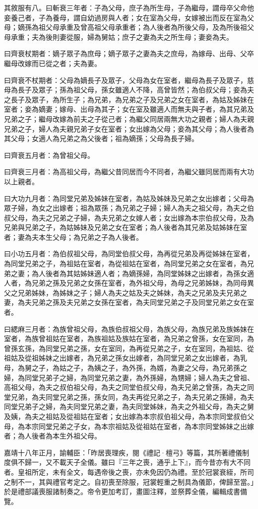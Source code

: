 其敘服有八。曰斬衰三年者：子為父母，庶子為所生母，子為繼母，謂母卒父命他妾養己者，子為養母，謂自幼過房與人者；女在室為父母，女嫁被出而反在室為父母；嫡孫為祖父母承重及曾高祖父母承重者；為人後者為所後父母，及為所後祖父母承重；夫為後則妻從服，婦為舅姑；庶子之妻為夫之所生母；妻妾為夫。

曰齊衰杖期者：嫡子眾子為庶母；嫡子眾子之妻為夫之庶母，為嫁母、出母、父卒繼母改嫁而已從之者；夫為妻。

曰齊衰不杖期者：父母為嫡長子及眾子，父母為女在室者，繼母為長子及眾子，慈母為長子及眾子；孫為祖父母，孫女雖適人不降，高曾皆然；為伯叔父母；妾為夫之長子及眾子，為所生子；為兄弟，為兄弟之子及兄弟之女在室者，為姑及姊妹在室者；妾為嫡妻；嫁母、出母為其子；女在室及雖適人而無夫與子者，為其兄弟及兄弟之子；繼母改嫁為前夫之子從己者；為繼父同居兩無大功之親者；婦人為夫親兄弟之子，婦人為夫親兄弟子女在室者；女出嫁為父母；妾為其父母；為人後者為其父母；女適人為兄弟之為父後者；祖為嫡孫；父母為長子婦。

曰齊衰五月者：為曾祖父母。

曰齊衰三月者：為高祖父母，為繼父昔同居而今不同者，為繼父雖同居而兩有大功以上親者。

曰大功九月者：為同堂兄弟及姊妹在室者，為姑及姊妹及兄弟之女出嫁者；父母為眾子婦，為女之出嫁者；祖為眾孫；為兄弟之子婦；婦人為夫之祖父母，為夫之伯叔父母，為夫之兄弟之子婦，為夫兄弟之女嫁人者；女出嫁為本宗伯叔父母，及為兄弟與兄弟之子，為姑姊妹及兄弟之女在室者；為人後者為其兄弟及姑姊妹在室者；妻為夫本生父母；為兄弟之子為人後者。

曰小功五月者：為伯叔祖父母，為同堂伯叔父母，為再從兄弟及再從姊妹在室者，為同堂兄弟之子，為祖姑在室者，為從祖姑在室者，為同堂兄弟之女在室者，為兄弟之妻；為人後者為其姑姊妹適人者；為嫡孫婦，為同堂姊妹之出嫁者，為孫女適人者，為兄弟之孫及兄弟之女孫在室者，為外祖父母，為母之兄弟姊妹，為同母異父之兄弟姊妹，為姊妹之子；婦人為夫之姑及夫之姊妹，為夫之兄弟及夫兄弟之妻，為夫兄弟之孫及夫兄弟之女孫在室者，為夫同堂兄弟之子及同堂兄弟之女在室者。

曰緦麻三月者：為族曾祖父母，為族伯叔祖父母，為族父母，為族兄弟及族姊妹在室者，為族曾祖姑在室者，為族祖姑及族姑在室者，為兄弟之曾孫，女在室同，為曾孫玄孫，為同堂兄弟之孫，女在室同，為再從兄弟之子，女在室同，為祖姑、從祖姑及從祖姊妹之出嫁者，為兄弟之孫女出嫁者，為同堂兄弟之女出嫁者，為乳母，為舅之子，為姑之子，為姨之子，為外孫，為婿，為妻之父母，為兄弟孫之婦，為同堂兄弟子之婦，為同堂兄弟之妻，為外孫婦，為甥婦；婦人為夫之曾祖、高祖父母，為夫之叔伯祖父母，為夫之同堂伯叔父母，為夫兄弟之曾孫，為夫之同堂兄弟，為夫同堂兄弟之孫，孫女同，為夫再從兄弟之子，為夫兄弟之孫婦，為夫同堂兄弟子之婦，為夫同堂兄弟之妻，為夫同堂姊妹，為夫之外祖父母，為夫之舅及姨，為夫之祖姑及從祖姑在室者；女出嫁為本宗叔伯祖父母，為本宗同堂叔伯父母，為本宗同堂兄弟之子女，為本宗祖姑及從祖姑在室者，為本宗同堂姊妹之出嫁者；為人後者為本生外祖父母。

嘉靖十八年正月，諭輔臣：「昨居喪理疾，閱《禮記·檀弓》等篇，其所著禮儀制度俱不歸一，又不載天子全儀。雖曰『三年之喪，通乎上下』，而今昔亦有大不同者。皇祖所定，未有全文，每遇帝後之喪，亦未免因仍為禮。至於冠裳衰絰，所司之制不一，其與禮官考定之。自初喪至除服，冠裳輕重之制具為儀節，俾歸至當。」於是禮部議喪服諸制奏之。帝令更加考訂，畫圖注釋，並祭葬全儀，編輯成書備覽。

